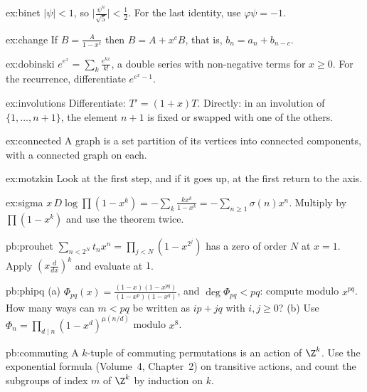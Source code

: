 \begin{hint}{ex:binet}
$|\psi|<1$, so $\bigl|\frac{\psi^n}{\sqrt5}\bigr|<\frac12$. For the last identity, use $\varphi\psi=-1$.
\end{hint}
\begin{hint}{ex:change}
If $B=\frac A{1-x^c}$ then $B=A+x^cB$, that is, $b_n=a_n+b_{n-c}$.
\end{hint}
\begin{hint}{ex:dobinski}
$e^{e^x}=\sum_k\frac{e^{kx}}{k!}$, a double series with non-negative terms for $x\ge0$. For the recurrence, differentiate
$e^{e^x-1}$.
\end{hint}
\begin{hint}{ex:involutions}
Differentiate: $T'=(1+x)T$. Directly: in an involution of $\{1,\dots,n+1\}$, the element $n+1$ is fixed or swapped with one
of the others.
\end{hint}
\begin{hint}{ex:connected}
A graph is a set partition of its vertices into connected components, with a connected graph on each.
\end{hint}
\begin{hint}{ex:motzkin}
Look at the first step, and if it goes up, at the first return to the axis.
\end{hint}
\begin{hint}{ex:sigma}
$x\,D\log\prod(1-x^k)=-\sum_k\frac{kx^k}{1-x^k}=-\sum_{n\ge1}\sigma(n)x^n$. Multiply by $\prod(1-x^k)$ and use the theorem twice.
\end{hint}

\begin{hint}{pb:prouhet}
$\sum_{n<2^N}t_nx^n=\prod_{j<N}(1-x^{2^j})$ has a zero of order $N$ at $x=1$. Apply $(x\frac d{dx})^k$ and evaluate at $1$.
\end{hint}

\begin{hint}{pb:phipq}
(a) $\Phi_{pq}(x)=\frac{(1-x)(1-x^{pq})}{(1-x^p)(1-x^q)}$, and $\deg\Phi_{pq}<pq$: compute modulo $x^{pq}$. How many ways
can $m<pq$ be written as $ip+jq$ with $i,j\ge0$? (b) Use $\Phi_n=\prod_{d\mid n}(1-x^d)^{\mu(n/d)}$ modulo $x^8$.
\end{hint}

\begin{hint}{pb:commuting}
A $k$-tuple of commuting permutations is an action of $\Z^k$. Use the exponential formula (Volume~4, Chapter~2) on transitive
actions, and count the subgroups of index $m$ of $\Z^k$ by induction on $k$.
\end{hint}

